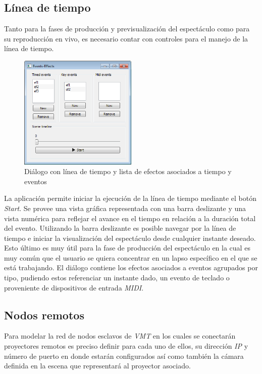 \subsection{Línea de tiempo}

Tanto para la fases de producción y previsualización del espectáculo como para su reproducción en vivo, es necesario contar con controles para el manejo de la línea de tiempo.

\begin{figure}[H]
  \centering
    \includegraphics[width=0.5\textwidth]{./Cap5_vmt/vmt_events_effects.png}
  \caption[Imagen propia.]{Diálogo con línea de tiempo y lista de efectos asociados a tiempo y eventos}
  \label{fig:VMT-Timeline}
\end{figure}

La aplicación permite iniciar la ejecución de la línea de tiempo mediante el botón \emph{Start}. Se provee una vista gráfica representada con una barra deslizante y una vista numérica para reflejar el avance en el tiempo en relación a la duración total del evento.
Utilizando la barra deslizante es posible navegar por la línea de tiempo e iniciar la visualización del espectáculo desde cualquier instante deseado. Esto último es muy útil para la fase de producción del espectáculo en la cual es muy común que el usuario se quiera concentrar en un lapso específico en el que se está trabajando.
El diálogo contiene los efectos asociados a eventos agrupados por tipo, pudiendo estos referenciar un instante dado, un evento de teclado o proveniente de dispositivos de entrada \emph{MIDI}.

\subsection{Nodos remotos}

Para modelar la red de nodos esclavos de \emph{VMT} en los cuales se conectarán proyectores remotos es preciso definir para cada uno de ellos, su dirección \emph{IP} y número de puerto en donde estarán configurados así como también la cámara definida en la escena que representará al proyector asociado.

